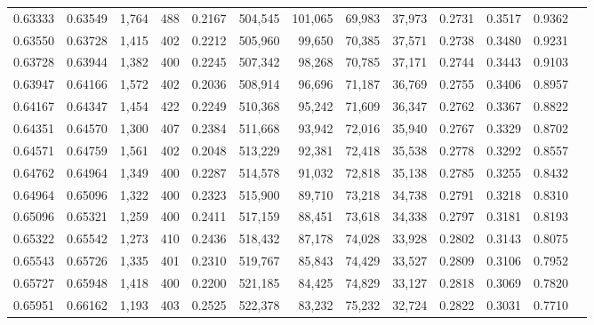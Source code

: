 \begin{tabular}{rrrrrrrrrrrrr}
0.63333 & 0.63549 &  1,764 &   488 &                                     0.2167 & 504,545 & 101,065 &  69,983 &  37,973 & 0.2731 & 0.3517 & 0.9362 \\
0.63550 & 0.63728 &  1,415 &   402 &                                     0.2212 & 505,960 &  99,650 &  70,385 &  37,571 & 0.2738 & 0.3480 & 0.9231 \\
0.63728 & 0.63944 &  1,382 &   400 &                                     0.2245 & 507,342 &  98,268 &  70,785 &  37,171 & 0.2744 & 0.3443 & 0.9103 \\
0.63947 & 0.64166 &  1,572 &   402 &                                     0.2036 & 508,914 &  96,696 &  71,187 &  36,769 & 0.2755 & 0.3406 & 0.8957 \\
0.64167 & 0.64347 &  1,454 &   422 &                                     0.2249 & 510,368 &  95,242 &  71,609 &  36,347 & 0.2762 & 0.3367 & 0.8822 \\
0.64351 & 0.64570 &  1,300 &   407 &                                     0.2384 & 511,668 &  93,942 &  72,016 &  35,940 & 0.2767 & 0.3329 & 0.8702 \\
0.64571 & 0.64759 &  1,561 &   402 &                                     0.2048 & 513,229 &  92,381 &  72,418 &  35,538 & 0.2778 & 0.3292 & 0.8557 \\
0.64762 & 0.64964 &  1,349 &   400 &                                     0.2287 & 514,578 &  91,032 &  72,818 &  35,138 & 0.2785 & 0.3255 & 0.8432 \\
0.64964 & 0.65096 &  1,322 &   400 &                                     0.2323 & 515,900 &  89,710 &  73,218 &  34,738 & 0.2791 & 0.3218 & 0.8310 \\
0.65096 & 0.65321 &  1,259 &   400 &                                     0.2411 & 517,159 &  88,451 &  73,618 &  34,338 & 0.2797 & 0.3181 & 0.8193 \\
0.65322 & 0.65542 &  1,273 &   410 &                                     0.2436 & 518,432 &  87,178 &  74,028 &  33,928 & 0.2802 & 0.3143 & 0.8075 \\
0.65543 & 0.65726 &  1,335 &   401 &                                     0.2310 & 519,767 &  85,843 &  74,429 &  33,527 & 0.2809 & 0.3106 & 0.7952 \\
0.65727 & 0.65948 &  1,418 &   400 &                                     0.2200 & 521,185 &  84,425 &  74,829 &  33,127 & 0.2818 & 0.3069 & 0.7820 \\
0.65951 & 0.66162 &  1,193 &   403 &                                     0.2525 & 522,378 &  83,232 &  75,232 &  32,724 & 0.2822 & 0.3031 & 0.7710 \\

\end{tabular}

